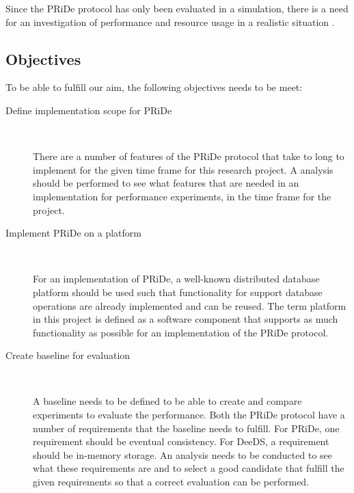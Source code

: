 Since the PRiDe protocol has only been evaluated in a simulation, there is a need for an investigation of performance and resource usage in a realistic situation \cite[]{Syber2007}.

\subsection{Objectives} %
\label{subsec:objectives}

To be able to fulfill our aim, the following objectives needs to be meet:  

\begin{description}

	\item[Define implementation scope for PRiDe] \

	There are a number of features of the PRiDe protocol that take to long to implement for the given time frame for this research project. A analysis should be performed to see what features that are needed in an implementation for performance experiments, in the time frame for the project.

	\item[Implement PRiDe on a platform] \

	For an implementation of PRiDe, a well-known distributed database platform should be used such that functionality for support database operations are already implemented and can be reused. The term platform in this project is defined as a software component that supports as much functionality as possible for an implementation of the PRiDe protocol. 

	\item[Create baseline for evaluation] \

	A baseline needs to be defined to be able to create and compare experiments to evaluate the performance. Both the PRiDe protocol have a number of requirements that the baseline needs to fulfill. For PRiDe, one requirement should be eventual consistency. For DeeDS, a requirement should be in-memory storage. An analysis needs to be conducted to see what these requirements are and to select a good candidate that fulfill the given requirements so that a correct evaluation can be performed.




\end{description}
